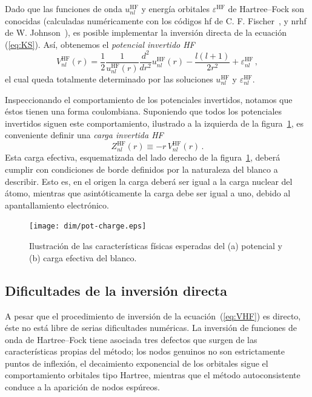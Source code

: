 Dado que las funciones de onda $u_{nl}^{\mathrm{HF}}$ y energía orbitales 
$\varepsilon^{\mathrm{HF}}$ de Hartree--Fock son conocidas (calculadas 
numéricamente con los códigos {\sc hf} de C. F. Fischer~\cite{FroeseFischer:97}, 
y {\sc nrhf} de W. Johnson~\cite{Johnson:07}), es posible implementar 
la inversión directa de la ecuación (\ref{eq:KS}). Así, obtenemos el 
\textit{potencial invertido HF} 
\begin{equation}
V_{nl}^{\mathrm{HF}}(r) = 
\frac{1}{2}\frac{1}{u_{nl}^{\mathrm{HF}}(r)}
\frac{d^2}{dr^{2}}u_{nl}^{\mathrm{HF}}(r) - 
\frac{l(l+1)}{2r^{2}}+\varepsilon _{nl}^{\mathrm{HF}} \,,
\label{eq:VHF}
\end{equation}
el cual queda totalmente determinado por las soluciones 
$u_{nl}^{\mathrm{HF}}$ y $\varepsilon_{nl}^{\mathrm{HF}}$.

Inspeccionando el comportamiento de los potenciales invertidos, notamos 
que éstos tienen una forma coulombiana. Suponiendo que todos los 
potenciales invertidos siguen este comportamiento, ilustrado a la 
izquierda de la figura~\ref{fig:potycharge}, es conveniente definir una 
\textit{carga invertida HF} 
\begin{equation}
Z_{nl}^{\mathrm{HF}}(r) \equiv -r \, V_{nl}^{\mathrm{HF}}(r) \,.
\label{eq:Zeff}
\end{equation}
Esta carga efectiva, esquematizada del lado derecho de la 
figura~\ref{fig:potycharge}, deberá cumplir con condiciones de borde 
definidos por la naturaleza del blanco a describir. Esto es, en el 
origen la carga deberá ser igual a la carga nuclear del átomo, mientras 
que asintóticamente la carga debe ser igual a uno, debido al 
apantallamiento electrónico.

\begin{figure}[t!]
\centering
\texttt{[image: dim/pot-charge.eps]}
\caption[Características físicas del potencial y carga efectiva.]
{Ilustración de las características físicas esperadas del (a) potencial 
y (b) carga efectiva del blanco.}
\label{fig:potycharge}
\end{figure}

\subsection{Dificultades de la inversión directa}
\label{subsec:difnumericasDIM}

A pesar que el procedimiento de inversión de la ecuación~(\ref{eq:VHF}) 
es directo, éste no está libre de serias dificultades numéricas. 
La inversión de funciones de onda de Hartree--Fock tiene asociada tres
defectos que surgen de las características propias del método; los nodos 
genuinos no son estrictamente puntos de inflexión, el decaimiento 
exponencial de los orbitales sigue el comportamiento orbitales tipo 
Hartree, mientras que el método autoconsistente conduce a la aparición 
de nodos espúreos. 

